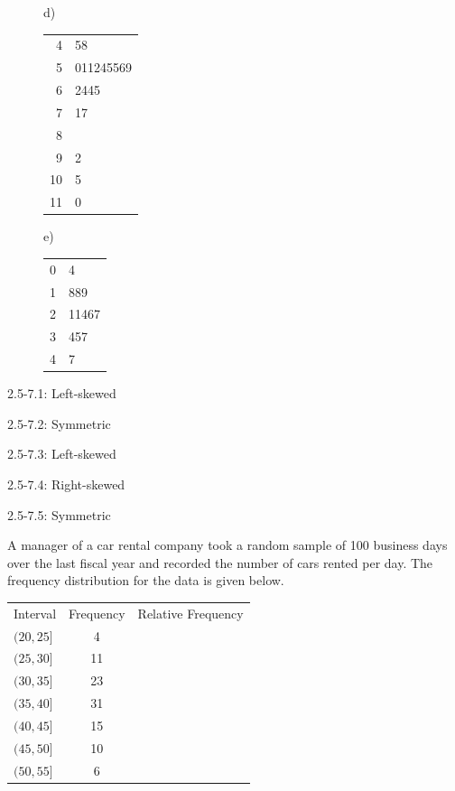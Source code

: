 \documentclass[11pt, chapterprefix=true]{scrbook}\usepackage[]{graphicx}\usepackage[]{color}
\begin{document}
\begin{exercises}
\begin{exercise}
\begin{figure}[ht]
\begin{minipage}[ht]{3cm}
  d)

    \begin{tabular}{@{} r|l @{}} \hline
  4 & 58 \\
  5 & 011245569 \\
  6 & 2445 \\
  7 & 17 \\
  8 &  \\
  9 & 2 \\
  10 & 5 \\
  11 & 0
    \end{tabular}
  \end{minipage} \hfill
  \begin{minipage}[ht]{3cm}
  e)

  \begin{tabular}{@{} r | l @{}} \hline
  0 & 4 \\
  1 & 889 \\
  2 & 11467 \\
  3 & 457 \\
  4 & 7
  \end{tabular}
  \end{minipage}

\end{figure}
\end{exercise}
\begin{solution}  %

2.5-7.1: Left-skewed

2.5-7.2: Symmetric

2.5-7.3: Left-skewed

2.5-7.4: Right-skewed

2.5-7.5: Symmetric

\end{solution}


  \begin{exercise} %

A manager of a car rental company took a random sample of 100 business days over the last fiscal year and recorded the number of cars rented per day.  The frequency distribution for the data is given below.

\begin{tabular}{@{} lcc @{}} \hline
Interval  &  Frequency &	Relative Frequency \\
$(20, 25]$ 	&      4 \\
$(25, 30]$ 	&    11  \\
$(30, 35]$ 	&    23 \\
$(35, 40]$ 	&    31 \\
$(40, 45]$ 	&    15 \\
$(45, 50]$ 	&    10 \\
$(50, 55]$ 	&      6 \\ \hline
\end{tabular}


\end{exercise}
\end{exercises}
\end{document}
